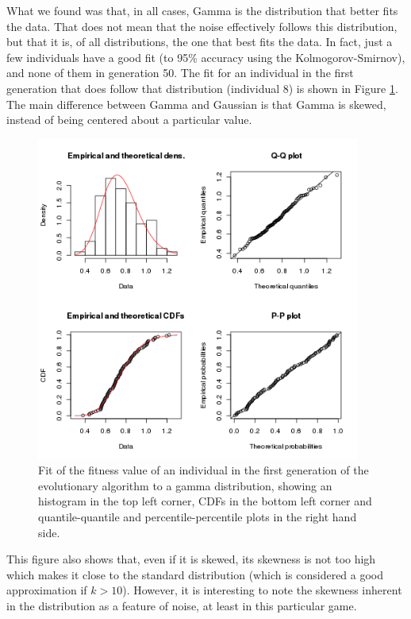 \documentclass{svmult}
\begin{document}
What we found was that, in all cases, Gamma is the distribution that
better fits the data. That does not mean that the noise effectively
follows this distribution, but that it is, of all distributions, the
one that best fits the data. In fact, just a few individuals have a good fit (to
95\% accuracy using the Kolmogorov-Smirnov), and none of them in
generation 50. The fit for an individual in the first generation that
does follow that distribution (individual 8) is shown in Figure
\ref{fig:indi8}. The main difference between Gamma and Gaussian is
that Gamma is skewed, instead of being centered about a particular
value. 
%
\begin{figure}[!t] %
\centering
\includegraphics[width=0.95\textwidth]{../images/indi8.png}
\caption{Fit of the fitness value of an individual in the first
  generation of the evolutionary algorithm to a gamma distribution,
  showing an histogram in the top left corner, CDFs in the bottom left
  corner and quantile-quantile and percentile-percentile plots in the
  right hand side. \label{fig:indi8}}
\end{figure}

This figure also shows that, even if it is skewed, its skewness is not
too high which makes it close to the standard distribution (which is
considered a good
approximation if $k>10$). However, it is interesting to note the
skewness inherent in the distribution as a feature of noise, at least
in this particular game. 
\end{document}

